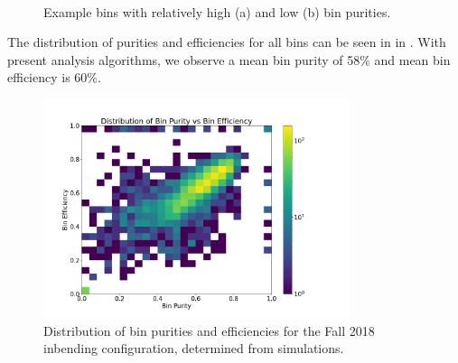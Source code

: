         
\begin{figure}[H]
    \centering
    \\
    \caption[Bin Purity Example Distributions]{Example bins with relatively high (a) and low (b) bin purities.}\label{fig:bin_purity_tphi}
\end{figure}


    The distribution of purities and efficiencies for all bins can be seen in in . With present analysis algorithms, we observe a mean bin purity of 58\% and mean bin efficiency is 60\%.

    \begin{figure}[H]
        \centering
        \includegraphics[trim={0 0 0 0},clip,width=0.8\textwidth]{Chapters/Ch5-Further/0_IBU/pics/overview/t1_bin_purity_vs_bin_efficiency.png}
        \caption[Bin Purity - Efficiency Distribution]{Distribution of bin purities and efficiencies for the Fall 2018 inbending configuration, determined from simulations.}
        \label{fig:bin_purity_eff_hist}
    \end{figure}


